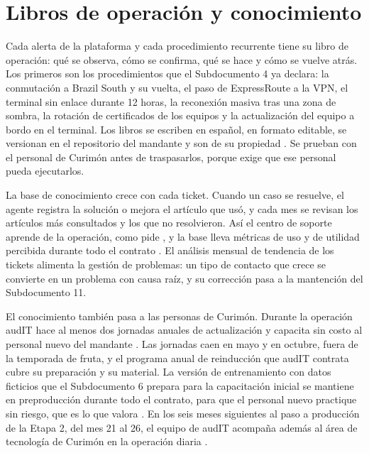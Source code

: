 \section{Libros de operación y conocimiento}\label{sec:10-libros-de-operacion-y-conocimien}

Cada alerta de la plataforma y cada procedimiento recurrente tiene su libro de operación: qué se
observa, cómo se confirma, qué se hace y cómo se vuelve atrás. Los primeros son los procedimientos que
el Subdocumento 4 ya declara: la conmutación a Brazil South y su vuelta, el paso de ExpressRoute a la
VPN, el terminal sin enlace durante 12 horas, la reconexión masiva tras una zona de sombra, la rotación
de certificados de los equipos y la actualización del equipo a bordo en el terminal. Los libros se
escriben en español, en formato editable, se versionan en el repositorio del mandante y son de su
propiedad . Se prueban con el personal de Curimón antes de traspasarlos, porque
 exige que ese personal pueda ejecutarlos.

La base de conocimiento crece con cada ticket. Cuando un caso se resuelve, el agente registra la solución
o mejora el artículo que usó, y cada mes se revisan los artículos más consultados y los que no
resolvieron. Así el centro de soporte aprende de la operación, como pide , y la
base lleva métricas de uso y de utilidad percibida durante todo el contrato . El
análisis mensual de tendencia de los tickets alimenta la gestión de problemas: un tipo de contacto que
crece se convierte en un problema con causa raíz, y su corrección pasa a la mantención del
Subdocumento 11.

El conocimiento también pasa a las personas de Curimón. Durante la operación audIT hace al menos dos
jornadas anuales de actualización y capacita sin costo al personal nuevo del mandante
. Las jornadas caen en mayo y en octubre, fuera de la temporada de fruta, y el
programa anual de reinducción que audIT contrata cubre su preparación y su material. La versión de
entrenamiento con datos ficticios que el Subdocumento 6 prepara para la capacitación inicial se mantiene
en preproducción durante todo el contrato, para que el personal nuevo practique sin riesgo, que es lo
que valora . En los seis meses siguientes al paso a producción de la Etapa 2, del
mes 21 al 26, el equipo de audIT acompaña además al área de tecnología de Curimón en la operación diaria
.

